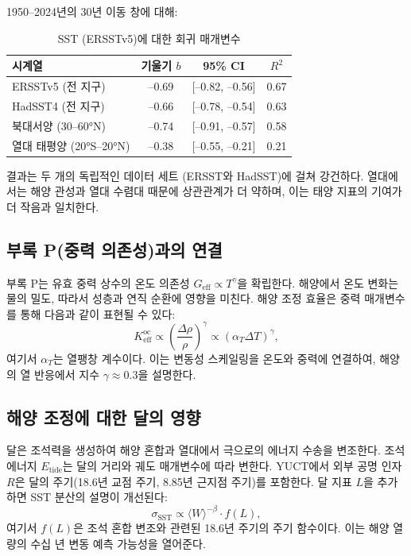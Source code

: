 \documentclass[11pt,a4paper]{article}
\newcommand{\Keff}{K_{\mathrm{eff}}}
\newcommand{\be}{\beta}
\newcommand{\ga}{\gamma}
\begin{document}
	1950–2024년의 30년 이동 창에 대해:
	
	\begin{table}[htbp]
		\centering
		\caption{SST (ERSSTv5)에 대한 회귀 매개변수}
		\label{tab:sst_reg}
		\begin{tabular}{@{}lccc@{}}
			\toprule
			시계열 & 기울기 $b$ & 95\% CI & $R^2$ \\
			\midrule
			ERSSTv5 (전 지구) & –0.69 & [–0.82, –0.56] & 0.67 \\
			HadSST4 (전 지구)  & –0.66 & [–0.78, –0.54] & 0.63 \\
			북대서양 (30–60°N) & –0.74 & [–0.91, –0.57] & 0.58 \\
			열대 태평양 (20°S–20°N) & –0.38 & [–0.55, –0.21] & 0.21 \\
			\bottomrule
		\end{tabular}
	\end{table}
	
	결과는 두 개의 독립적인 데이터 세트 (ERSST와 HadSST)에 걸쳐 강건하다. 열대에서는 해양 관성과 열대 수렴대 때문에 상관관계가 더 약하며, 이는 태양 지표의 기여가 더 작음과 일치한다.
	
	\subsection{부록 P(중력 의존성)과의 연결}
	
	부록 P는 유효 중력 상수의 온도 의존성 $G_{\text{eff}} \propto T^{\ga}$을 확립한다. 해양에서 온도 변화는 물의 밀도, 따라서 성층과 연직 순환에 영향을 미친다. 해양 조정 효율은 중력 매개변수를 통해 다음과 같이 표현될 수 있다:
	\[
	\Keff^{\text{oc}} \propto \left( \frac{\Delta \rho}{\rho} \right)^{\ga} \propto (\alpha_T \Delta T)^{\ga},
	\]
	여기서 $\alpha_T$는 열팽창 계수이다. 이는 변동성 스케일링을 온도와 중력에 연결하여, 해양의 열 반응에서 지수 $\ga \approx 0.3$을 설명한다.
	
	\subsection{해양 조정에 대한 달의 영향}
	
	달은 조석력을 생성하여 해양 혼합과 열대에서 극으로의 에너지 수송을 변조한다. 조석 에너지 $E_{\text{tide}}$는 달의 거리와 궤도 매개변수에 따라 변한다. YUCT에서 외부 공명 인자 $R$은 달의 주기(18.6년 교점 주기, 8.85년 근지점 주기)를 포함한다. 달 지표 $L$을 추가하면 SST 분산의 설명이 개선된다:
	\[
	\sigma_{\text{SST}} \propto \langle W \rangle^{-\be} \cdot f(L),
	\]
	여기서 $f(L)$은 조석 혼합 변조와 관련된 18.6년 주기의 주기 함수이다. 이는 해양 열량의 수십 년 변동 예측 가능성을 열어준다.
	
\end{document}
